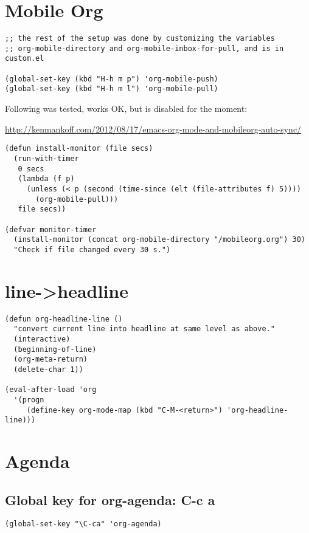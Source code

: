 \documentclass[10pt]{article}
\begin{document}
\section{Mobile Org}
\label{sec-6}

\begin{verbatim}
;; the rest of the setup was done by customizing the variables
;; org-mobile-directory and org-mobile-inbox-for-pull, and is in custom.el

(global-set-key (kbd "H-h m p") 'org-mobile-push)
(global-set-key (kbd "H-h m l") 'org-mobile-pull)
\end{verbatim}

Following was tested, works OK, but is disabled for the moment:

\url{http://kenmankoff.com/2012/08/17/emacs-org-mode-and-mobileorg-auto-sync/}

\begin{verbatim}
(defun install-monitor (file secs)
  (run-with-timer
   0 secs
   (lambda (f p)
     (unless (< p (second (time-since (elt (file-attributes f) 5))))
       (org-mobile-pull)))
   file secs))

(defvar monitor-timer
  (install-monitor (concat org-mobile-directory "/mobileorg.org") 30)
  "Check if file changed every 30 s.")
\end{verbatim}
\section{line->headline}
\label{sec-7}

\begin{verbatim}
(defun org-headline-line ()
  "convert current line into headline at same level as above."
  (interactive)
  (beginning-of-line)
  (org-meta-return)
  (delete-char 1))

(eval-after-load 'org
  '(progn
     (define-key org-mode-map (kbd "C-M-<return>") 'org-headline-line)))
\end{verbatim}

\section{Agenda}
\label{sec-8}
\subsection{Global key for org-agenda: C-c a}
\label{sec-8-1}
\begin{verbatim}
(global-set-key "\C-ca" 'org-agenda)
\end{verbatim}
\end{document}

